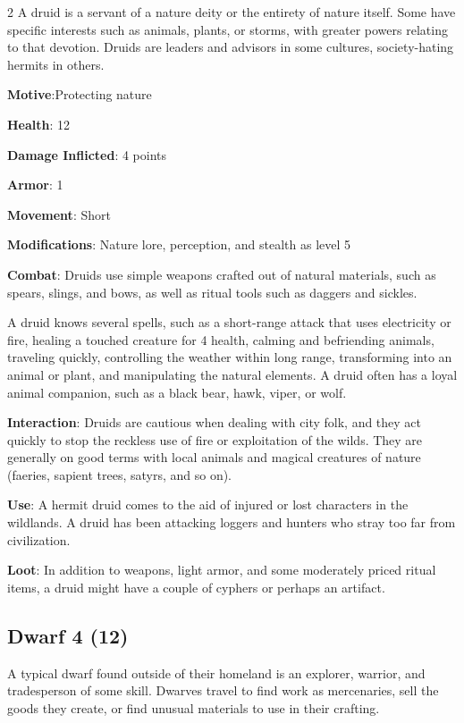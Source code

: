 \begin{multicols}{2}
A druid is a servant of a nature deity or the entirety of nature itself. Some have specific interests such as animals, plants, or storms, with greater powers relating to that devotion. Druids are leaders and advisors in some cultures, society-hating hermits in others. 

\textbf{Motive}:Protecting nature 

\textbf{Health}: 12 

\textbf{Damage Inflicted}: 4 points 

\textbf{Armor}: 1 

\textbf{Movement}: Short 

\textbf{Modifications}: Nature lore, perception, and stealth as level 5 

\textbf{Combat}: Druids use simple weapons crafted out of natural materials, such as spears, slings, and bows, as well as ritual tools such as daggers and sickles. 

A druid knows several spells, such as a short-range attack that uses electricity or fire, healing a touched creature for 4 health, calming and befriending animals, traveling quickly, controlling the weather within long range, transforming into an animal or plant, and manipulating the natural elements. A druid often has a loyal animal companion, such as a black bear, hawk, viper, or wolf. 

\textbf{Interaction}: Druids are cautious when dealing with city folk, and they act quickly to stop the reckless use of fire or exploitation of the wilds. They are generally on good terms with local animals and magical creatures of nature (faeries, sapient trees, satyrs, and so on). 

\textbf{Use}: A hermit druid comes to the aid of injured or lost characters in the wildlands. A druid has been attacking loggers and hunters who stray too far from civilization. 

\textbf{Loot}: In addition to weapons, light armor, and some moderately priced ritual items, a druid might have a couple of cyphers or perhaps an artifact.


\subsection{Dwarf 4 (12)}

A typical dwarf found outside of their homeland is an explorer, warrior, and tradesperson of some skill. Dwarves travel to find work as mercenaries, sell the goods they create, or find unusual materials to use in their crafting. 


\end{multicols}
